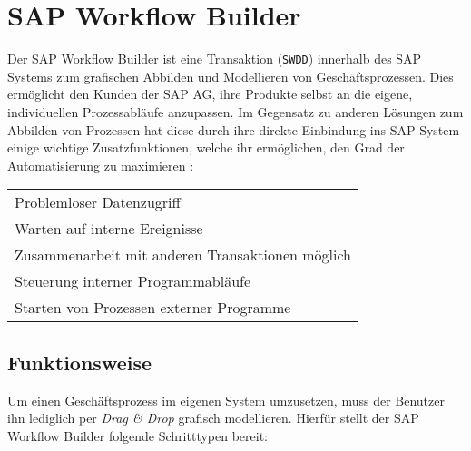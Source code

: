 \documentclass{handout}
\begin{document}
\section{SAP Workflow Builder}
Der SAP Workflow Builder ist eine Transaktion (\texttt{SWDD}) innerhalb des SAP Systems zum grafischen Abbilden und Modellieren von Geschäftsprozessen. Dies ermöglicht den Kunden der SAP AG, ihre Produkte selbst an die eigene, individuellen Prozessabläufe anzupassen. Im Gegensatz zu anderen Lösungen zum Abbilden von Prozessen hat diese durch ihre direkte Einbindung ins SAP System einige wichtige Zusatzfunktionen, welche ihr ermöglichen, den Grad der Automatisierung zu maximieren \cite{SAPHelpWf}:

\small
\begin{tabular}{L}
Problemloser Datenzugriff\\
Warten auf interne Ereignisse\\
Zusammenarbeit mit anderen Transaktionen möglich\\
Steuerung interner Programmabläufe\\
Starten von Prozessen externer Programme
\end{tabular}
\normalsize

\subsection{Funktionsweise}
Um einen Geschäftsprozess im eigenen System umzusetzen, muss der Benutzer ihn lediglich per \textit{Drag \& Drop} grafisch modellieren. Hierfür stellt der SAP Workflow Builder folgende Schritttypen bereit:
\end{document}
